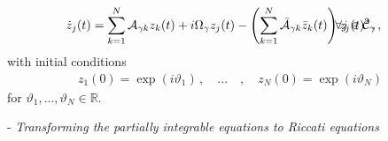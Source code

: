 \documentclass[aps,pre,reprint,longbibliography,superscriptaddress,noshowpacs,floatfix]{revtex4-2}
\theoremstyle{definition}
\theoremstyle{remark}
\begin{document}
\begin{align}
      \dot{z}_j(t) &=  \sum_{k=1}^N \mathcal{A}_{\gamma k}z_k(t) + i \Omega_{\gamma} z_j(t) - \left(\sum_{k=1}^N\bar{\mathcal{A}}_{\gamma k}\bar{z}_k(t)\right)z_j(t)^2\,,\hspace{-1.5cm} &&\forall j\in  \mathcal{C}_\gamma\,,\label{eq:kur_PI} %
\end{align}
with initial conditions
\begin{align}
    z_1(0) = \exp(i\vartheta_1)\,,\quad ...\quad, \quad z_N(0) = \exp(i\vartheta_N) \label{eq:kur_CI}
\end{align}
for $\vartheta_1,...,\vartheta_N \in \mathbb{R}$. %

\vspace{0.3cm}
\noindent- \textit{Transforming the partially integrable equations to Riccati equations}
\vspace{0.3cm}
\end{document}
